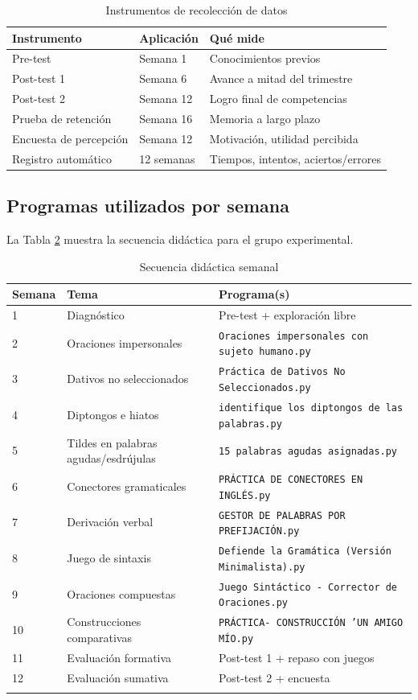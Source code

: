 \documentclass[12pt,spanish]{article}
\newcommand{\programa}[1]{\texttt{#1}}
\begin{document}
\begin{table}[H]
\centering
\caption{Instrumentos de recolección de datos}
\label{tab:instrumentos}
\begin{tabular}{|p{4cm}|p{4cm}|p{5cm}|}
\hline
\textbf{Instrumento} & \textbf{Aplicación} & \textbf{Qué mide} \\
\hline
Pre-test & Semana 1 & Conocimientos previos \\
\hline
Post-test 1 & Semana 6 & Avance a mitad del trimestre \\
\hline
Post-test 2 & Semana 12 & Logro final de competencias \\
\hline
Prueba de retención & Semana 16 & Memoria a largo plazo \\
\hline
Encuesta de percepción & Semana 12 & Motivación, utilidad percibida \\
\hline
Registro automático & 12 semanas & Tiempos, intentos, aciertos/errores \\
\hline
\end{tabular}
\end{table}

\subsection{Programas utilizados por semana}

La Tabla \ref{tab:programas} muestra la secuencia didáctica para el grupo experimental.

\begin{longtable}{|p{2cm}|p{4cm}|p{7cm}|}
\hline
\textbf{Semana} & \textbf{Tema} & \textbf{Programa(s)} \\
\hline
1 & Diagnóstico & Pre-test + exploración libre \\
\hline
2 & Oraciones impersonales & \programa{Oraciones impersonales con sujeto humano.py} \\
\hline
3 & Dativos no seleccionados & \programa{Práctica de Dativos No Seleccionados.py} \\
\hline
4 & Diptongos e hiatos & \programa{identifique los diptongos de las palabras.py} \\
\hline
5 & Tildes en palabras agudas/esdrújulas & \programa{15 palabras agudas asignadas.py} \\
\hline
6 & Conectores gramaticales & \programa{PRÁCTICA DE CONECTORES EN INGLÉS.py} \\
\hline
7 & Derivación verbal & \programa{GESTOR DE PALABRAS POR PREFIJACIÓN.py} \\
\hline
8 & Juego de sintaxis & \programa{Defiende la Gramática (Versión Minimalista).py} \\
\hline
9 & Oraciones compuestas & \programa{Juego Sintáctico - Corrector de Oraciones.py} \\
\hline
10 & Construcciones comparativas & \programa{PRÁCTICA- CONSTRUCCIÓN 'UN AMIGO MÍO.py} \\
\hline
11 & Evaluación formativa & Post-test 1 + repaso con juegos \\
\hline
12 & Evaluación sumativa & Post-test 2 + encuesta \\
\hline
\caption{Secuencia didáctica semanal}
\label{tab:programas}
\end{longtable}
\end{document}
